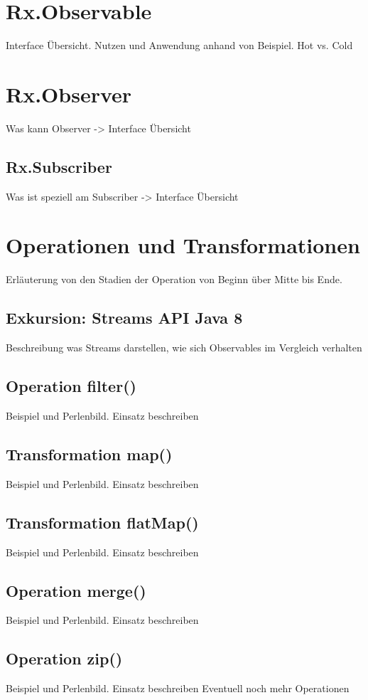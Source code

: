 \section{Rx.Observable}
Interface Übersicht. Nutzen und Anwendung anhand von Beispiel. Hot vs. Cold
\section{Rx.Observer}
Was kann Observer -> Interface Übersicht
\subsection{Rx.Subscriber}
Was ist speziell am Subscriber -> Interface Übersicht
\section{Operationen und Transformationen}
Erläuterung von den Stadien der Operation von Beginn über Mitte bis Ende.
\subsection{Exkursion: Streams API Java 8}
Beschreibung was Streams darstellen, wie sich Observables im Vergleich verhalten
\subsection{Operation filter()}
Beispiel und Perlenbild. Einsatz beschreiben
\subsection{Transformation map()}
Beispiel und Perlenbild. Einsatz beschreiben
\subsection{Transformation flatMap()}
Beispiel und Perlenbild. Einsatz beschreiben
\subsection{Operation merge()}
Beispiel und Perlenbild. Einsatz beschreiben
\subsection{Operation zip()}
Beispiel und Perlenbild. Einsatz beschreiben
Eventuell noch mehr Operationen

